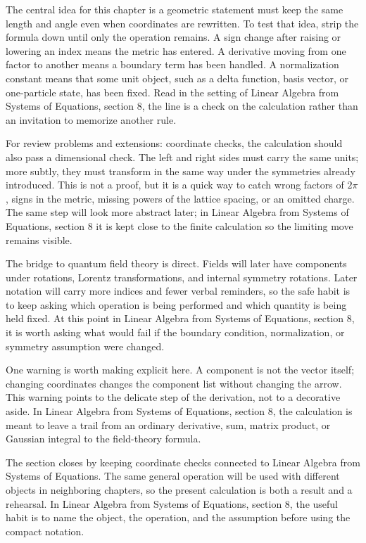 The central idea for this chapter is a geometric statement must keep the same length and angle even when coordinates are rewritten.  To test that idea, strip the formula down until only the operation remains.  A sign change after raising or lowering an index means the metric has entered.  A derivative moving from one factor to another means a boundary term has been handled.  A normalization constant means that some unit object, such as a delta function, basis vector, or one-particle state, has been fixed.  Read in the setting of Linear Algebra from Systems of Equations, section 8, the line is a check on the calculation rather than an invitation to memorize another rule.

For review problems and extensions: coordinate checks, the calculation should also pass a dimensional check.  The left and right sides must carry the same units; more subtly, they must transform in the same way under the symmetries already introduced.  This is not a proof, but it is a quick way to catch wrong factors of \(2\pi\), signs in the metric, missing powers of the lattice spacing, or an omitted charge.  The same step will look more abstract later; in Linear Algebra from Systems of Equations, section 8 it is kept close to the finite calculation so the limiting move remains visible.

The bridge to quantum field theory is direct.  Fields will later have components under rotations, Lorentz transformations, and internal symmetry rotations.  Later notation will carry more indices and fewer verbal reminders, so the safe habit is to keep asking which operation is being performed and which quantity is being held fixed.  At this point in Linear Algebra from Systems of Equations, section 8, it is worth asking what would fail if the boundary condition, normalization, or symmetry assumption were changed.

One warning is worth making explicit here.  A component is not the vector itself; changing coordinates changes the component list without changing the arrow.  This warning points to the delicate step of the derivation, not to a decorative aside.  In Linear Algebra from Systems of Equations, section 8, the calculation is meant to leave a trail from an ordinary derivative, sum, matrix product, or Gaussian integral to the field-theory formula.

The section closes by keeping coordinate checks connected to Linear Algebra from Systems of Equations.  The same general operation will be used with different objects in neighboring chapters, so the present calculation is both a result and a rehearsal.  In Linear Algebra from Systems of Equations, section 8, the useful habit is to name the object, the operation, and the assumption before using the compact notation.



